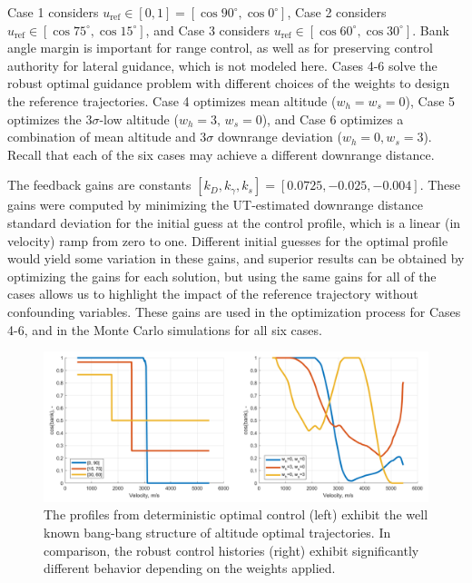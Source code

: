 Case 1 considers $u_{\mathrm{ref}}\in[0,1] = [\cos90^{\circ},\cos0^{\circ}]$, Case 2 considers $u_{\mathrm{ref}}\in [\cos75^{\circ},\cos15^{\circ}]$, and Case 3 considers $u_{\mathrm{ref}}\in [\cos60^{\circ},\cos30^{\circ}]$.
Bank angle margin is important for range control, as well as for preserving control authority for lateral guidance, which is not modeled here. 
Cases 4-6 solve the robust optimal guidance problem with different choices of the weights to design the reference trajectories. Case 4 optimizes mean altitude ($ w_h=w_s=0 $), Case 5 optimizes the 3$\sigma$-low altitude ($ w_h=3,\,w_s=0 $), and Case 6 optimizes a combination of mean altitude and 3$\sigma$ downrange deviation ($ w_h=0, w_s=3 $). Recall that each of the six cases may achieve a different downrange distance.

The feedback gains are constants $[k_D, k_{\gamma}, k_s] = [0.0725, -0.025, -0.004]$.  These gains were computed by minimizing the UT-estimated downrange distance standard deviation for the initial guess at the control profile, which is a linear (in velocity) ramp from zero to one. Different initial guesses for the optimal profile would yield some variation in these gains, and superior results can be obtained by optimizing the gains for each solution, but using the same gains for all of the cases allows us to highlight the impact of the reference trajectory without confounding variables. These gains are used in the optimization process for Cases 4-6, and in the Monte Carlo simulations for all six cases. 

\begin{figure}[h!]
	\centering
	\includegraphics[width=1\textwidth]{../PropellantOptimalJournal/ddp/comparison_controls}
	\caption{The profiles from deterministic optimal control (left) exhibit the well known bang-bang structure of altitude optimal trajectories. In comparison, the robust control histories (right) exhibit significantly different behavior depending on the weights applied.}
	\label{fig_control_comparison}
\end{figure}

